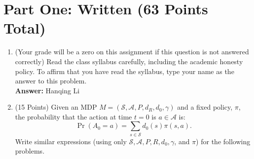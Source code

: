 \documentclass[]{article}
\begin{document}
\section*{Part One: Written (63 Points Total)}
\begin{enumerate}
    \item (Your grade will be a zero on this assignment if this question is not answered correctly) Read the class syllabus carefully, including the academic honesty policy. To affirm that you have read the syllabus, type your name as the answer to this problem. \\

    \textbf{Answer:} Hanqing Li
    \item (15 Points) Given an MDP $M=(\mathcal S, \mathcal A, P, d_R, d_0, \gamma)$ and a fixed policy, $\pi$, the probability that the action at time $t=0$ is $a \in \mathcal A$ is:
    \begin{equation}
        \Pr(A_0=a)=\sum_{s \in \mathcal S} d_0(s) \pi(s,a).
    \end{equation}
    Write similar expressions (using only $\mathcal S,\mathcal A,P,R,d_0,\gamma$, and $\pi$) for the following problems.\\
    

\end{enumerate}
\end{document}
